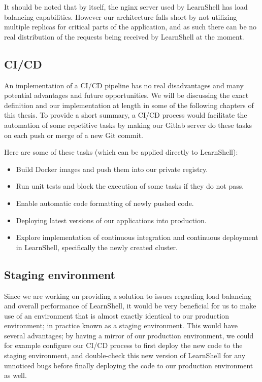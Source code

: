 \documentclass[thesis=B,english]{FITthesis}[2019/12/23]
\begin{document}
It should be noted that by itself, the nginx server used by LearnShell has load balancing capabilities. However our architecture falls short by not utilizing multiple replicas for critical parts of the application, and as such there can be no real distribution of the requests being received by LearnShell at the moment.

\subsection{CI/CD}

An implementation of a CI/CD pipeline has no real disadvantages and many potential advantages and future opportunities. We will be discussing the exact definition and our implementation at length in some of the following chapters of this thesis. To provide a short summary, a CI/CD process would facilitate the automation of some repetitive tasks by making our Gitlab server do these tasks on each push or merge of a new Git commit.

Here are some of these tasks (which can be applied directly to LearnShell):

\begin{itemize}
  \setlength\itemsep{0em}
  \item Build Docker images and push them into our private registry.
  \item Run unit tests and block the execution of some tasks if they do not pass.
  \item Enable automatic code formatting of newly pushed code.
  \item Deploying latest versions of our applications into production.
  \item Explore implementation of continuous integration and continuous deployment in LearnShell, specifically the newly created cluster.
\end{itemize}

\subsection{Staging environment}

Since we are working on providing a solution to issues regarding load balancing and overall performance of LearnShell, it would be very beneficial for us to make use of an environment that is almost exactly identical to our production environment; in practice known as a staging environment. \cite{staging-server} This would have several advantages; by having a mirror of our production environment, we could for example configure our CI/CD process to first deploy the new code to the staging environment, and double-check this new version of LearnShell for any unnoticed bugs before finally deploying the code to our production environment as well. 
\end{document}

